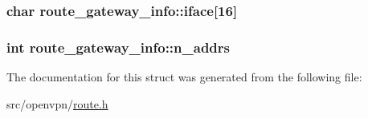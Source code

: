 \subsubsection[{iface}]{\setlength{\rightskip}{0pt plus 5cm}char route\+\_\+gateway\+\_\+info\+::iface\mbox{[}16\mbox{]}}\label{structroute__gateway__info_aaf17695926fe4ba822c86256742f005b}
\hypertarget{structroute__gateway__info_ac2f1688b2f4f2544b1c75a6028714579}{}
\subsubsection[{n\+\_\+addrs}]{\setlength{\rightskip}{0pt plus 5cm}int route\+\_\+gateway\+\_\+info\+::n\+\_\+addrs}\label{structroute__gateway__info_ac2f1688b2f4f2544b1c75a6028714579}


The documentation for this struct was generated from the following file\+:\begin{DoxyCompactItemize}
\item 
src/openvpn/\hyperlink{route_8h}{route.\+h}\end{DoxyCompactItemize}
